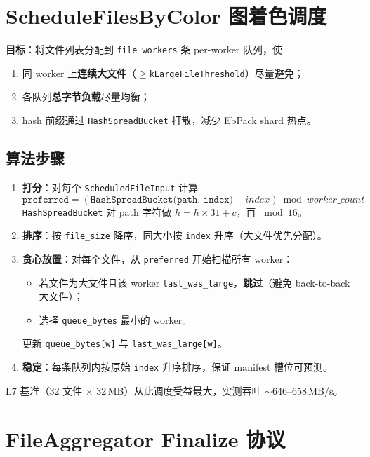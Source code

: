 \section{ScheduleFilesByColor 图着色调度}

\textbf{目标}：将文件列表分配到 \texttt{file\_workers} 条 per-worker 队列，使
\begin{enumerate}
  \item 同 worker 上\textbf{连续大文件}（$\geq$\texttt{kLargeFileThreshold}）尽量避免；
  \item 各队列\textbf{总字节负载}尽量均衡；
  \item hash 前缀通过 \texttt{HashSpreadBucket} 打散，减少 EbPack shard 热点。
\end{enumerate}

\subsection{算法步骤}

\begin{enumerate}
  \item \textbf{打分}：对每个 \texttt{ScheduledFileInput} 计算
  \[
  \texttt{preferred} = (\texttt{HashSpreadBucket(path, index)} + index) \bmod worker\_count
  \]
  \texttt{HashSpreadBucket} 对 path 字符做 $h = h \times 31 + c$，再 $\bmod 16$。
  \item \textbf{排序}：按 \texttt{file\_size} 降序，同大小按 \texttt{index} 升序（大文件优先分配）。
  \item \textbf{贪心放置}：对每个文件，从 \texttt{preferred} 开始扫描所有 worker：
  \begin{itemize}[nosep]
    \item 若文件为大文件且该 worker \texttt{last\_was\_large}，\textbf{跳过}（避免 back-to-back 大文件）；
    \item 选择 \texttt{queue\_bytes} 最小的 worker。
  \end{itemize}
  更新 \texttt{queue\_bytes[w]} 与 \texttt{last\_was\_large[w]}。
  \item \textbf{稳定}：每条队列内按原始 \texttt{index} 升序排序，保证 manifest 槽位可预测。
\end{enumerate}

L7 基准（32 文件 $\times$ 32\,MB）从此调度受益最大，实测吞吐 $\sim$646--658\,MB/s。

\section{FileAggregator Finalize 协议}

